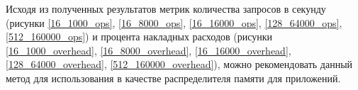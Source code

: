 Исходя из полученных результатов метрик количества запросов в секунду (рисунки \ref{16_1000_ops}, \ref{16_8000_ops}, \ref{16_16000_ops}, \ref{128_64000_ops}, \ref{512_160000_ops}) и процента накладных расходов (рисунки \ref{16_1000_overhead}, \ref{16_8000_overhead}, \ref{16_16000_overhead}, \ref{128_64000_overhead}, \ref{512_160000_overhead}), можно рекомендовать данный метод для использования в качестве распределителя памяти для приложений.

